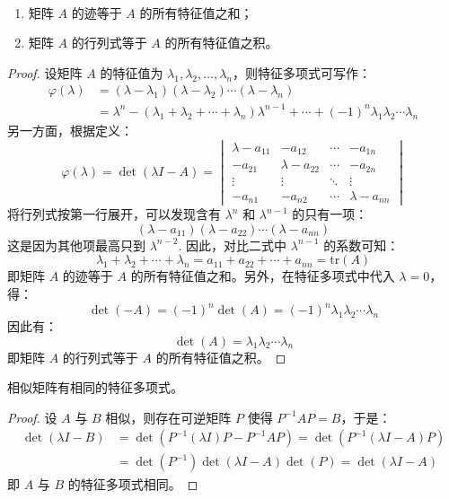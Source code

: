 \begin{theorem}
\ 
\begin{enumerate}
    \item 矩阵 $A$ 的迹等于 $A$ 的所有特征值之和；
    \item 矩阵 $A$ 的行列式等于 $A$ 的所有特征值之积。
\end{enumerate}
\end{theorem}
\begin{proof}
设矩阵 $A$ 的特征值为 $\lambda_1,\lambda_2,\ldots,\lambda_n$，则特征多项式可写作：
\begin{align*}
    \varphi(\lambda)&=(\lambda-\lambda_1)(\lambda-\lambda_2)\cdots(\lambda-\lambda_n)\\
    &=\lambda^n-(\lambda_1+\lambda_2+\cdots+\lambda_n)\lambda^{n-1}+\cdots+(-1)^n\lambda_1\lambda_2\cdots\lambda_n
\end{align*}
另一方面，根据定义：
\[
    \varphi(\lambda)=\det(\lambda I-A)=
    \begin{vmatrix}
    \lambda-a_{11}&-a_{12}&\cdots&-a_{1n}\\
    -a_{21}&\lambda-a_{22}&\cdots&-a_{2n}\\
    \vdots&\vdots&\ddots&\vdots\\
    -a_{n1}&-a_{n2}&\cdots&\lambda-a_{nn}
    \end{vmatrix}
\]
将行列式按第一行展开，可以发现含有 $\lambda^n$ 和 $\lambda^{n-1}$ 的只有一项：
\[
    (\lambda-a_{11})(\lambda-a_{22})\cdots(\lambda-a_{nn})
\]
这是因为其他项最高只到 $\lambda^{n-2}$. 因此，对比二式中 $\lambda^{n-1}$ 的系数可知：
\[
    \lambda_1+\lambda_2+\cdots+\lambda_n=a_{11}+a_{22}+\cdots+a_{nn}=\text{tr}(A)
\]
即矩阵 $A$ 的迹等于 $A$ 的所有特征值之和。另外，在特征多项式中代入 $\lambda=0$，得：
\[
    \det(-A)=(-1)^n\det(A)=(-1)^n\lambda_1\lambda_2\cdots\lambda_n
\]
因此有：
\[
    \det(A)=\lambda_1\lambda_2\cdots\lambda_n
\]
即矩阵 $A$ 的行列式等于 $A$ 的所有特征值之积。
\end{proof}

\begin{theorem}
\label{thm:sim-eigen}
相似矩阵有相同的特征多项式。
\end{theorem}
\begin{proof}
设 $A$ 与 $B$ 相似，则存在可逆矩阵 $P$ 使得 $P^{-1}AP=B$，于是：
\begin{align*}
    \det(\lambda I-B)&=\det(P^{-1}(\lambda I)P-P^{-1}AP)=\det(P^{-1}(\lambda I-A)P)\\
    &=\det(P^{-1})\det(\lambda I-A)\det(P)=\det(\lambda I-A)
\end{align*}
即 $A$ 与 $B$ 的特征多项式相同。
\end{proof}

